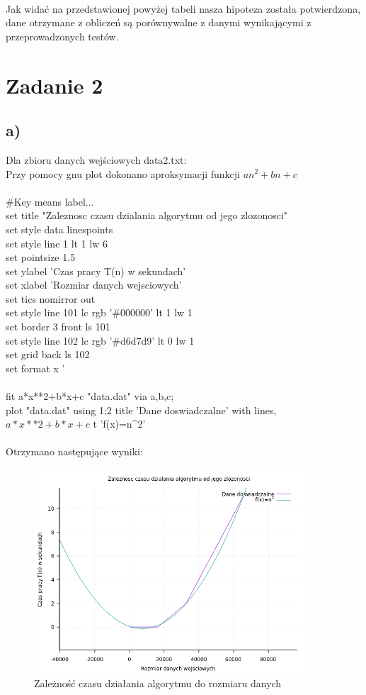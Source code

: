 \documentclass{article}
\begin{document}
\\Jak widać na przedstawionej powyżej tabeli nasza hipoteza została potwierdzona, dane otrzymane z obliczeń są porównywalne z danymi wynikającymi z przeprowadzonych testów.
\section{Zadanie 2}
\subsection{a)}
Dla zbioru danych wejściowych data2.txt:\\
Przy pomocy gnu plot dokonano aproksymacji funkcji $an^2+bn+c$
\\\\
\#Key means label...\\
set title "Zaleznosc czasu dzialania algorytmu od jego zlozonosci"\\
set style data linespoints\\
set style line 1 lt 1 lw 6\\
set pointsize 1.5\\
set ylabel 'Czas pracy T(n) w sekundach'\\
set xlabel 'Rozmiar danych wejsciowych'\\
set tics nomirror out\\
set style line 101 lc rgb '\#000000' lt 1 lw 1\\
set border 3 front ls 101\\
set style line 102 lc rgb '\#d6d7d9' lt 0 lw 1\\
set grid back ls 102\\
set format x '%
\\
\\
fit a*x**2+b*x+c "data.dat" via a,b,c;\\
plot "data.dat" using 1:2 title 'Dane doswiadczalne' with lines, $a*x**2+b*x+c$ t 'f(x)=n^2'\\
\\
\endgroup
Otrzymano następujące wyniki:\\
\begin{figure}[bhp]
    \centering
    \includegraphics[width=4in,height=3in]{zadanie2.png}
    \caption{Zależność czasu działania algorytmu do rozmiaru danych}
    \label{fig:my_label}
\end{figure}
\end{document}
